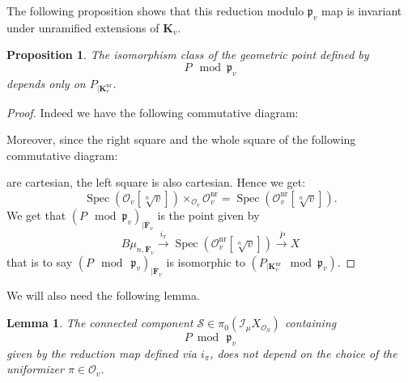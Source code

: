 \documentclass{proc-l}
\newcommand{\K}{\mathbf{K}}
\newcommand{\F}{\mathbf{F}}
\newcommand{\I}{\mathcal{I}}
\newcommand{\G}{\mathbf{G}}
\DeclareMathOperator{\Spec}{Spec}
\DeclareMathOperator{\un}{nr}
\newcommand{\stackS}{\mathcal{S}}
\newcommand{\affine}{\mathbf{A}}
\newcommand{\sheafO}{\mathcal{O}}
\newtheorem{lemma}[theorem]{Lemma}
\newtheorem{prop}[theorem]{Proposition}
\theoremstyle{definition}
\theoremstyle{remark}
\numberwithin{equation}{section}
\begin{document}
The following proposition shows that this reduction modulo $\mathfrak{p}_v$ map is invariant under unramified extensions of $\K_v$.

\begin{prop}\label{prop_invariance_unramified_extension_reduction_map}
   The isomorphism class of the geometric point defined by $$P \mod \mathfrak{p}_v$$ depends only on $P_{| \K_v^{\un}}$.
\end{prop}

\begin{proof}
    Indeed we have the following commutative diagram:
    \begin{center}
    \end{center}Moreover, since the right square and the whole square of the following commutative diagram:
    \begin{center}
    \end{center}are cartesian, the left square is also cartesian. Hence we get:
    $$\Spec(\sheafO_v[\sqrt[n]{v}]) \times_{\sheafO_v} \sheafO_v^{\un} = \Spec(\sheafO_v^{\un}[\sqrt[n]{v}]) .$$ We get that $\left( P \mod \mathfrak{p}_v \right)_{\mid \overline{\F}_v}$ is the point given by
$$ B \mu_{n,\overline{\F}_v} \xrightarrow{i_{\pi}} \Spec(\sheafO_v^{\un}[\sqrt[n]{v}]) \xrightarrow{\overline P} X $$ that is to say $\left( P \mod \ \mathfrak{p}_v \right)_{| \overline{\F}_v} $ is isomorphic to $ \left( P_{| \K_v^{\un}} \mod  \mathfrak{p}_v \right)$.
\end{proof}

We will also need the following lemma.

\begin{lemma}\label{lemma_independance_uniformizer}
The connected component $\stackS \in \pi_0(\I_{\mu} X_{\sheafO_S})$ containing $$P \bmod \,\mathfrak{p}_v$$given by the reduction map defined via $i_{\pi}$, does not depend on the choice of the uniformizer $\pi \in \sheafO_v$.
\end{lemma}
\end{document}
